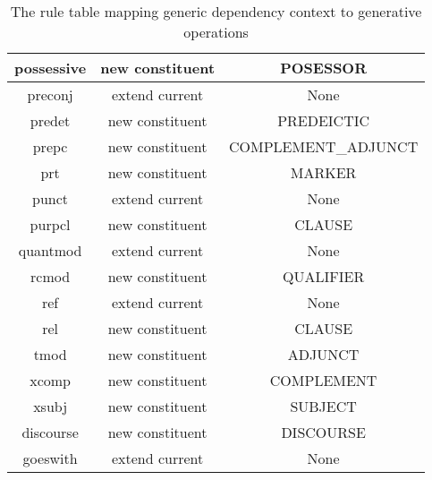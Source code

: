 \begin{table}[]
{\begin{tabular}{|c|c|c|}
            possessive            & new constituent             & POSESSOR                         \\ \hline
            preconj               & extend current              & None                             \\ \hline
            predet                & new constituent             & PREDEICTIC                       \\ \hline
            prepc                 & new constituent             & COMPLEMENT\_ADJUNCT              \\ \hline
            prt                   & new constituent             & MARKER                           \\ \hline
            punct                 & extend current              & None                             \\ \hline
            purpcl                & new constituent             & CLAUSE                           \\ \hline
            quantmod              & extend current              & None                             \\ \hline
            rcmod                 & new constituent             & QUALIFIER                        \\ \hline
            ref                   & extend current              & None                             \\ \hline
            rel                   & new constituent             & CLAUSE                           \\ \hline
            tmod                  & new constituent             & ADJUNCT                          \\ \hline
            xcomp                 & new constituent             & COMPLEMENT                       \\ \hline
            xsubj                 & new constituent             & SUBJECT                          \\ \hline
            discourse             & new constituent             & DISCOURSE                        \\ \hline
            goeswith              & extend current              & None                             \\ \hline
        \end{tabular}%
    }
    \caption{The rule table mapping generic dependency context to generative operations}
    \label{tab:rule-table-complete}
\end{table}

